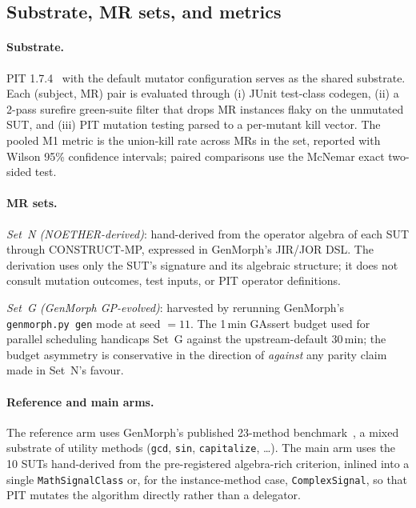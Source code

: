 \subsection{Substrate, MR sets, and metrics}
\label{subsec:empirical-setup}

\paragraph{Substrate.}
PIT 1.7.4~\cite{Coles2016PIT} with the default mutator configuration
serves as the shared substrate. Each (subject, MR) pair is evaluated
through (i) JUnit test-class codegen, (ii) a 2-pass surefire
green-suite filter that drops MR instances flaky on the unmutated
SUT, and (iii) PIT mutation testing parsed to a per-mutant kill
vector. The pooled M1 metric is the union-kill rate across MRs in the
set, reported with Wilson 95\% confidence intervals; paired
comparisons use the McNemar exact two-sided test.

\paragraph{MR sets.}
\textit{Set~N (NOETHER-derived)}: hand-derived from the operator
algebra of each SUT through CONSTRUCT-MP, expressed in GenMorph's
JIR/JOR DSL. The derivation uses only the SUT's signature and its
algebraic structure; it does not consult mutation outcomes, test
inputs, or PIT operator definitions.

\textit{Set~G (GenMorph GP-evolved)}: harvested by rerunning
GenMorph's \texttt{genmorph.py gen} mode at seed $=11$. The 1\,min
GAssert budget used for parallel scheduling handicaps Set~G against
the upstream-default 30\,min; the budget asymmetry is conservative in
the direction of \emph{against} any parity claim made in Set~N's
favour.

\paragraph{Reference and main arms.}
The reference arm uses GenMorph's published 23-method
benchmark~\cite{Ayerdi2023GenMorph}, a mixed substrate of utility
methods (\texttt{gcd}, \texttt{sin}, \texttt{capitalize}, \ldots).
The main arm uses the 10 SUTs hand-derived from the pre-registered
algebra-rich criterion, inlined into a single \texttt{MathSignalClass}
or, for the instance-method case, \texttt{ComplexSignal}, so that PIT
mutates the algorithm directly rather than a delegator.

